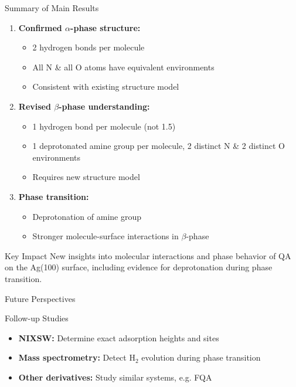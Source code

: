 \documentclass[xcolor=dvipsnames, aspectratio=169]{beamer}
\begin{document}
\begin{frame}{Summary of Main Results}
    \begin{enumerate}
        \item \textbf{Confirmed $\alpha$-phase structure:}
        \begin{itemize}
            \item 2 hydrogen bonds per molecule
            \item All N \& all O atoms have equivalent environments
            \item Consistent with existing structure model
        \end{itemize}
        
        \item \textbf{Revised $\beta$-phase understanding:}
        \begin{itemize}
            \item 1 hydrogen bond per molecule (not 1.5)
            \item 1 deprotonated amine group per molecule, 2 distinct N \& 2 distinct O environments
            \item Requires new structure model
        \end{itemize}
        
        \item \textbf{Phase transition:}
        \begin{itemize}
            \item Deprotonation of amine group
            \item Stronger molecule-surface interactions in $\beta$-phase
        \end{itemize}
    \end{enumerate}
    
    \begin{alertblock}{Key Impact}
        New insights into molecular interactions and phase behavior of \acs{QA} on the Ag(100) surface, including evidence for deprotonation during phase transition.
    \end{alertblock}
\end{frame}

\begin{frame}{Future Perspectives}
    \begin{block}{Follow-up Studies}
        \begin{itemize}
            \item \textbf{\Ac{NIXSW}:} Determine exact adsorption heights and sites
            \item \textbf{Mass spectrometry:} Detect H$_2$ evolution during phase transition
            \item \textbf{Other derivatives:} Study similar systems, e.g. FQA
        \end{itemize}
    \end{block}
\end{frame}
\end{document}
